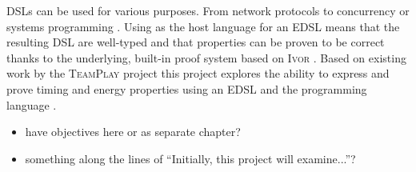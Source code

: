 DSLs can be used for various purposes. From network protocols \cite{5158855} to concurrency or systems programming \cite{brady2010correct,10.1007/978-3-642-27694-1_18}. Using \Idris as the host language for an EDSL means that the resulting DSL are well-typed and that properties can be proven to be correct thanks to the underlying, built-in proof system based on \textsc{Ivor} \cite{10.1007/978-3-540-74130-5_9,brady_2013}. Based on existing work by the \textsc{TeamPlay} project \cite{teamplay:d1.1} this project explores the ability to express and prove timing and energy properties using an EDSL and the \Idris programming language \cite{brady_2013}.

\begin{itemize}
	\item have objectives here or as separate chapter?
	\item something along the lines of ``Initially, this project will examine...''?
\end{itemize}